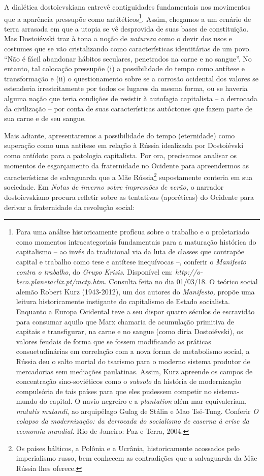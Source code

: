 A dialética dostoievskiana entrevê contiguidades fundamentais nos
movimentos que a aparência pressupõe como antitéticos\footnote{Para uma
  análise historicamente profícua sobre o trabalho e o proletariado como
  momentos intracategoriais fundamentais para a maturação histórica do
  capitalismo -- ao invés da tradicional via da luta de classes que
  contrapõe capital e trabalho como tese e antítese inequívocas --,
  conferir o \emph{Manifesto contra o trabalho}, do \emph{Grupo Krisis}.
  Disponível em:
  \emph{http://o-beco.planetaclix.pt/mctp.htm}.
  Consulta feita no dia 01/03/18. O teórico social alemão Robert Kurz
  (1943-2012), um dos autores do \emph{Manifesto,} propõe uma leitura
  historicamente instigante do capitalismo de Estado socialista.
  Enquanto a Europa Ocidental teve a seu dispor quatro séculos de
  escravidão para consumar aquilo que Marx chamaria de acumulação
  primitiva de capitais e transfigurar, na carne e no sangue (como diria
  Dostoiévski), os valores feudais de forma que se fossem modificando as
  práticas consuetudinárias em correlação com a nova forma de
  metabolismo social, a Rússia deu o salto mortal do tsarismo para o
  moderno sistema produtor de mercadorias sem mediações paulatinas.
  Assim, Kurz apreende os campos de concentração sino-soviéticos como o
  \emph{subsolo} da história de modernização compulsória de tais países
  para que eles pudessem competir no sistema-mundo do capital. O navio
  negreiro e a \emph{plantation} além-mar equivaleriam, \emph{mutatis
  mutandi}, ao arquipélago Gulag de Stálin e Mao Tsé-Tung. Conferir
  \emph{O colapso da modernização: da derrocada do socialismo de caserna
  à crise da economia mundial.} Rio de Janeiro: Paz e Terra, 2004.}.
Assim, chegamos a um cenário de terra arrasada em que a utopia se vê
desprovida de suas bases de constituição. Mas Dostoiévski traz à tona a
noção de \emph{natureza} como o devir dos usos e costumes que se vão
cristalizando como características identitárias de um povo. ``Não é
fácil abandonar hábitos seculares, penetrados na carne e no sangue''. No
entanto, tal colocação pressupõe (i) a possibilidade do tempo como
antítese e transformação e (ii) o questionamento sobre se a corrosão
ocidental dos valores se estenderia irrestritamente por todos os lugares
da mesma forma, ou se haveria alguma nação que teria condições de
resistir à autofagia capitalista -- a derrocada da civilização -- por
conta de suas características autóctones que fazem parte de sua carne e
de seu sangue.

Mais adiante, apresentaremos a possibilidade do tempo (eternidade) como
superação como uma antítese em relação à Rússia idealizada por
Dostoiévski como antídoto para a patologia capitalista. Por ora,
precisamos analisar os momentos de esgarçamento da fraternidade no
Ocidente para apreendermos as características de salvaguarda que a Mãe
Rússia\footnote{Os países bálticos, a Polônia e a Ucrânia,
  historicamente acossados pelo imperialismo russo, bem conhecem as
  contradições que a salvaguarda da Mãe Rússia lhes oferece.}
supostamente conteria em sua sociedade. Em \emph{Notas de inverno sobre
impressões de verão,} o narrador dostoievskiano procura refletir sobre
as tentativas (aporéticas) do Ocidente para derivar a fraternidade da
revolução social:

